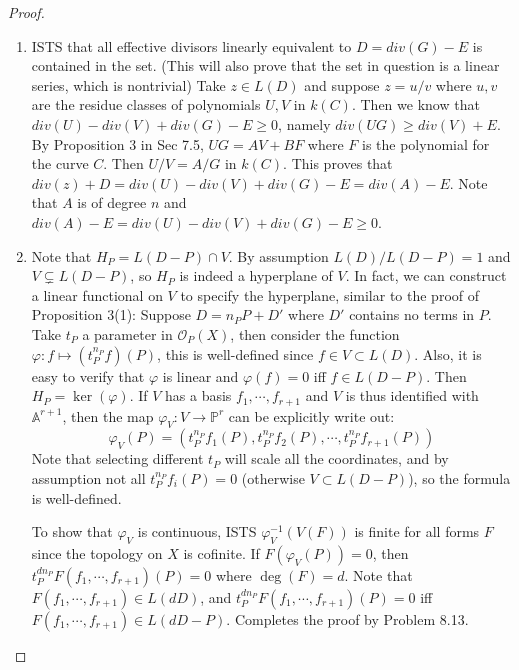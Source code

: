\documentclass{solution}
\begin{document}
\begin{proof}
    \begin{enumerate}
        \item ISTS that all effective divisors linearly equivalent to $D = div(G) - E$ is contained in the set. (This will also prove that the set in question is a linear series, which is nontrivial) Take $z \in L(D)$ and suppose $z = u / v$ where $u, v$ are the residue classes of polynomials $U, V$ in $k(C)$. Then we know that $div(U) - div(V) + div(G) - E \ge 0$, namely $div(UG) \ge div(V) + E$. By Proposition 3 in Sec 7.5, $UG = AV + BF$ where $F$ is the polynomial for the curve $C$. Then $U / V = A / G$ in $k(C)$. This proves that $div(z) + D = div(U) - div(V) + div(G) - E = div(A) - E$. Note that $A$ is of degree $n$ and $div(A) - E = div(U) - div(V) + div(G) - E \ge 0$.
        \item Note that $H_P = L(D - P) \cap V$. By assumption $L(D) / L(D - P) = 1$ and $V \subsetneq L(D - P)$, so $H_P$ is indeed a hyperplane of $V$. In fact, we can construct a linear functional on $V$ to specify the hyperplane, similar to the proof of Proposition 3(1): Suppose $D = n_PP + D'$ where $D'$ contains no terms in $P$. Take $t_P$ a parameter in $\mathcal{O}_{P}(X)$, then consider the function $\varphi: f \mapsto (t_P^{n_P}f)(P)$, this is well-defined since $f \in V \subset L(D)$. Also, it is easy to verify that $\varphi$ is linear and $\varphi(f) = 0$ iff $f \in L(D - P)$. Then $H_P = \ker(\varphi)$. If $V$ has a basis $f_1, \cdots, f_{r + 1}$ and $V$ is thus identified with $\mathbb{A}^{r + 1}$, then the map $\varphi_V: V \rightarrow \mathbb{P}^r$ can be explicitly write out:
        $$\varphi_V(P) = (t_P^{n_{P}}f_1(P), t_P^{n_{P}}f_2(P), \cdots, t_P^{n_P}f_{r + 1}(P))$$
        Note that selecting different $t_P$ will scale all the coordinates, and by assumption not all $t_P^{n_P}f_i(P) = 0$ (otherwise $V \subset L(D - P)$), so the formula is well-defined.

        To show that $\varphi_V$ is continuous, ISTS $\varphi_V ^{-1}(V(F))$ is finite for all forms $F$ since the topology on $X$ is cofinite. If $F(\varphi_V(P)) = 0$, then $t_P^{dn_P}F(f_1, \cdots, f_{r + 1})(P) = 0$ where $\deg(F) = d$. Note that $F(f_1, \cdots, f_{r + 1}) \in L(dD)$, and $t_P^{dn_P}F(f_1, \cdots, f_{r + 1})(P) = 0$ iff $F(f_1, \cdots, f_{r + 1}) \in L(dD - P)$. Completes the proof by Problem 8.13.


\end{enumerate}
\end{proof}
\end{document}
